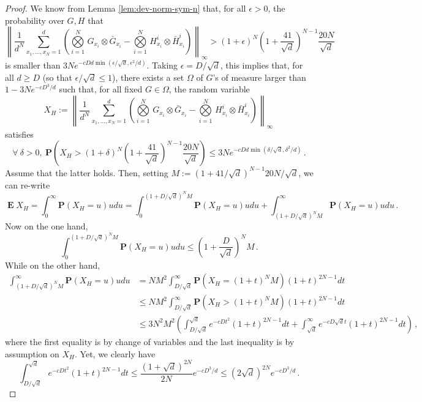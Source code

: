 \documentclass{amsart}
\renewcommand{\P}{\mathbf{P}}
\renewcommand{\leq}{\leqslant}
\renewcommand{\geq}{\geqslant}
\DeclareMathOperator{\E}{\mathbf{E}}
\begin{document}
\begin{proof}
    We know from Lemma \ref{lem:dev-norm-sym-n} that, for all $\epsilon>0$, the probability over $G,H$ that
    \[ \left\| \frac{1}{d^N}\sum_{x_1,\ldots,x_N=1}^d \left( \underset{i=1}{\overset{N}{\bigotimes}}\, G_{x_i}\otimes\bar{G}_{x_i} - \underset{i=1}{\overset{N}{\bigotimes}}\, H_{x_i}^i\otimes\bar{H}_{x_i}^i \right) \right\|_{\infty} > \left(1+\epsilon\right)^N \left(1+\frac{41}{\sqrt{d}}\right)^{N-1}\frac{20N}{\sqrt{d}} \]
    is smaller than $3Ne^{-cDd\min(\epsilon/\sqrt{d},\epsilon^2/d)}$. Taking $\epsilon=D/\sqrt{d}$, this implies that, for all $d\geq D$ (so that $\epsilon/\sqrt{d}\leq 1$), there exists a set $\Omega$ of $G$'s of measure larger than $1-3Ne^{-cD^3/d}$ such that, for all fixed $G\in\Omega$, the random variable
    \[ X_H:= \left\| \frac{1}{d^N}\sum_{x_1,\ldots,x_N=1}^d \left( \underset{i=1}{\overset{N}{\bigotimes}}\, G_{x_i}\otimes\bar{G}_{x_i} - \underset{i=1}{\overset{N}{\bigotimes}}\, H_{x_i}^i\otimes\bar{H}_{x_i}^i \right) \right\|_{\infty} \, \]
    satisfies
    \[ \forall\ \delta>0,\ \P\left( X_H > \left(1+\delta\right)^N \left(1+\frac{41}{\sqrt{d}}\right)^{N-1}\frac{20N}{\sqrt{d}} \right) \leq 3Ne^{-cDd\min(\delta/\sqrt{d},\delta^2/d)} \, . \]
    Assume that the latter holds. Then, setting $M:=(1+41/\sqrt{d})^{N-1}20N/\sqrt{d}$, we can re-write
    \[ \E X_H = \int_0^{\infty}\P(X_H=u)udu = \int_0^{(1+D/\sqrt{d})^NM}\P(X_H=u)udu + \int_{(1+D/\sqrt{d})^NM}^{\infty}\P(X_H=u)udu \, . \]
    Now on the one hand,
    \[ \int_0^{(1+D/\sqrt{d})^NM}\P(X_H=u)udu \leq \left(1+\frac{D}{\sqrt{d}}\right)^NM \, . \]
    While on the other hand,
    \begin{align*}
        \int_{(1+D/\sqrt{d})^NM}^{\infty}\P(X_H=u)udu & = NM^2\int_{D/\sqrt{d}}^{\infty}\P\left(X_H=(1+t)^NM\right) (1+t)^{2N-1}dt                                                                        \\
                                                      & \leq NM^2 \int_{D/\sqrt{d}}^{\infty}\P\left(X_H>(1+t)^NM\right) (1+t)^{2N-1}dt                                                                    \\
                                                      & \leq 3N^2M^2\left( \int_{D/\sqrt{d}}^{\sqrt{d}} e^{-cDt^2} (1+t)^{2N-1}dt + \int_{\sqrt{d}}^{\infty} e^{-cD\sqrt{d}t} (1+t)^{2N-1}dt \right) \, ,
    \end{align*}
    where the first equality is by change of variables and the last inequality is by assumption on $X_H$.
    Yet, we clearly have
    \[ \int_{D/\sqrt{d}}^{\sqrt{d}} e^{-cDt^2} (1+t)^{2N-1}dt \leq \frac{(1+\sqrt{d})^{2N}}{2N} e^{-cD^3/d} \leq (2\sqrt{d})^{2N}e^{-cD^3/d} \, . \]

\end{proof}
\end{document}
